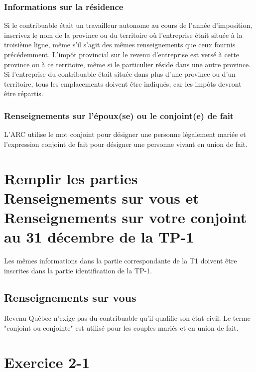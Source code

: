 \subsubsection{Informations sur la résidence}
Si le contribuable était un travailleur autonome au cours de l'année d'imposition, inscrivez le nom de la province ou du territoire où l'entreprise était située à la troisième ligne, même s'il s'agit des mêmes renseignements que ceux fournis précédemment. L'impôt provincial sur le revenu d'entreprise est versé à cette province ou à ce territoire, même si le particulier réside dans une autre province. Si l'entreprise du contribuable était située dans plus d'une province ou d'un territoire, tous les emplacements doivent être indiqués, car les impôts devront être répartis.

\subsubsection{Renseignements sur l'époux(se) ou le conjoint(e) de fait}
\ca
L'ARC utilise le mot \og conjoint\fg{} pour désigner une personne légalement mariée et l'expression \og conjoint de fait\fg{} pour désigner une personne vivant en union de fait. 



\section{Remplir les parties \og Renseignements sur vous\fg{} et  \og Renseignements sur votre conjoint au 31 décembre\fg{} de la TP-1}
\begin{intro}
	Les mêmes informations dans la partie correspondante de la T1 doivent être inscrites dans la partie identification de la TP-1.
\end{intro}


\subsection{Renseignements sur vous}
Revenu Québec n'exige pas du contribuable qu'il qualifie son état civil. Le terme "conjoint ou conjointe" est utilisé pour les couples mariés et en union de fait.



\section{Exercice 2-1}
\setcounter{question}{0}
\begin{question}
	
\end{question}



